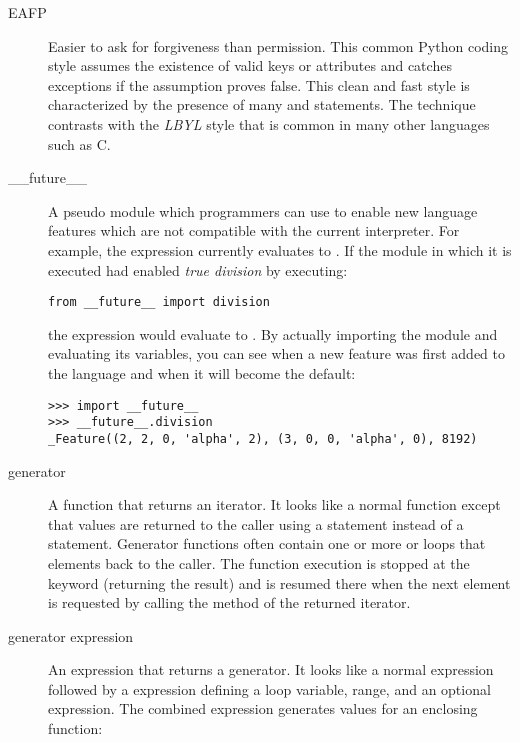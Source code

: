 \begin{description}
\item[EAFP]
Easier to ask for forgiveness than permission.  This common Python
coding style assumes the existence of valid keys or attributes and
catches exceptions if the assumption proves false.  This clean and
fast style is characterized by the presence of many  and
{} statements.  The technique contrasts with the
{}\emph{LBYL} style that is common in many other languages such as C.

\item[__future__]
A pseudo module which programmers can use to enable new language
features which are not compatible with the current interpreter.  For
example, the expression  currently evaluates to .
If the module in which it is executed had enabled \emph{true division}
by executing:

\begin{verbatim}
from __future__ import division
\end{verbatim}

the expression  would evaluate to .  By actually
importing the 
module and evaluating its variables, you can see when a new feature
was first added to the language and when it will become the default:

\begin{verbatim}
>>> import __future__
>>> __future__.division
_Feature((2, 2, 0, 'alpha', 2), (3, 0, 0, 'alpha', 0), 8192)
\end{verbatim}

\item[generator]
A function that returns an iterator.  It looks like a normal function except
that values are returned to the caller using a  statement
instead of a {} statement.  Generator functions often
contain one or more {} or  loops that
 elements back to the caller.  The function execution is
stopped at the {} keyword (returning the result) and is
resumed there when the next element is requested by calling the
 method of the returned iterator.

\item[generator expression]
An expression that returns a generator.  It looks like a normal expression
followed by a  expression defining a loop variable, range, and
an optional  expression.  The combined expression generates
values for an enclosing function:


\end{description}
